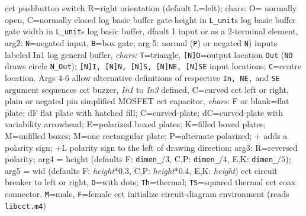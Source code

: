  {cct}
  {pushbutton switch R=right orientation (default L=left);
     chars: O= normally open, C=normally closed }
  {log}
  {basic buffer gate height in {\tt L\_unit}s}
  {log}
  {basic buffer gate width in {\tt L\_unit}s}
  {log}
  {basic buffer, dfault 1 input or as a 2-terminal element,
    arg2: {\tt N}=negated input, {\tt B}=box gate; arg 5:
    normal ({\tt P}) or negated {\tt N}) inputs labeled In1 
    }
  {log}
  {general buffer, {\sl chars:} {\tt T}=triangle,
            {\tt [N]O}=output location {\tt Out}
            ({\tt NO} draws circle {\tt N\_Out});
            {\tt [N]I, [N]N, [N]S, [N]NE, [N]SE}
            input locations; {\tt C}=centre location.
            Args 4-6 allow alternative
            definitions of respective {\tt In, NE,}
            and {\tt SE} argument sequences }
  {cct}
  {buzzer, {\sl In1} to {\sl In3} defined, C=curved
   }
%
  {cct}
  {left or right, plain or negated pin simplified MOSFET}
  {cct}
  {capacitor, {\sl chars}:
    F or blank=flat plate;
    dF flat plate with hatched fill;
    C=curved-plate;
    dC=curved-plate with variability arrowhead;
    E=polarized boxed plates;
    K=filled boxed plates;
    M=unfilled boxes;
    M=one rectangular plate;
    P=alternate polarized;
    + adds a polarity sign;
    +L polarity sign to the left of drawing direction;
    arg3:  R=reversed polarity;
    arg4 = height (defaults F: {\tt dimen\_}$/3$,
      C,P: {\tt dimen\_}$/4$, E,K: {\tt dimen\_}$/5$);
    arg5 = wid (defaults F: {\sl height}*0.3,
      C,P: {\sl height}*0.4, E,K: {\sl height}) }
  {cct}
  {circuit breaker to left or right, {\tt D}=with dots; {\tt Th}=thermal;
   {\tt TS}=squared thermal}
  {cct}
  {coax connector, {\tt M}=male, {\tt F}=female
    }
  {cct}
  {initialize circuit-diagram environment (reads {\tt libcct.m4})}
